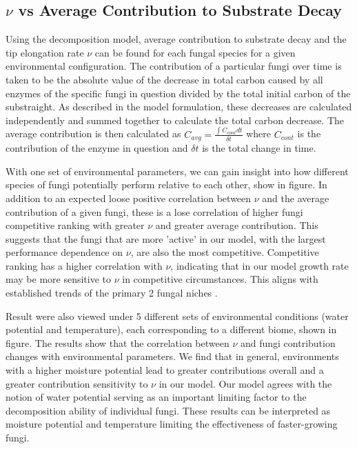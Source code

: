 \documentclass{article}
\begin{document}
 \subsection{$\nu$ vs Average Contribution to Substrate Decay} %
Using the decomposition model, average contribution to substrate decay and the tip elongation rate $\nu$ can be found for each fungal species for a given environmental configuration. The contribution of a particular fungi over time is taken to be the absolute value of the decrease in total carbon caused by all enzymes of the specific fungi in question divided by the total initial carbon of the substraight. As described in the model formulation, these decreases are calculated independently and summed together to calculate the total carbon decrease. The average contribution is then calculated as $C_{avg} = \frac{ \int C_{cont} dt}{\delta t}$ where $C_{cont}$ is the contribution of the enzyme in question and $\delta t$ is the total change in time.

With one set of environmental parameters, we can gain insight into how different species of fungi potentially perform relative to each other, show in figure. In addition to an expected loose positive correlation between $\nu$ and the average contribution of a given fungi, these is a lose correlation of higher fungi competitive ranking with greater $\nu$ and greater average contribution. This suggests that the fungi that are more 'active' in our model, with the largest performance dependence on $\nu$, are also the most competitive. Competitive ranking has a higher correlation with $\nu$, indicating that in our model growth rate may be more sensitive to $\nu$ in competitive circumstances. This aligns with established trends of the primary 2 fungal niches \cite{Maynard2019}.

Result were also viewed under 5 different sets of environmental conditions (water potential and temperature), each corresponding to a different biome, shown in figure. The results show that the correlation between $\nu$ and fungi contribution changes with environmental parameters. We find that in general, environments with a higher moisture potential lead to greater contributions overall and a greater contribution sensitivity to $\nu$ in our model. Our model agrees with the notion of water potential serving as an important limiting factor to the decomposition ability of individual fungi. These results can be interpreted as moisture potential and temperature limiting the effectiveness of faster-growing fungi. 
\end{document}
